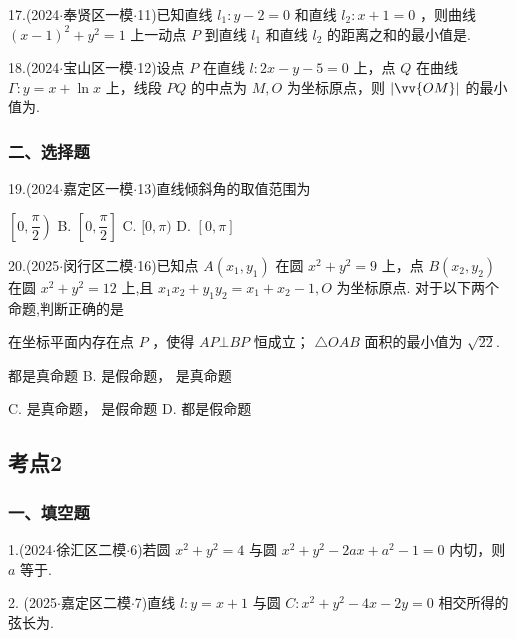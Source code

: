 17.(2024$\cdot$奉贤区一模$\cdot$11)已知直线 ${l}_{1} : y - 2 = 0$ 和直线 ${l}_{2} : x + 1 = 0$ ，则曲线 ${\left( x - 1\right) }^{2} + {y}^{2} = 1$ 上一动点 $P$ 到直线 ${l}_{1}$ 和直线 ${l}_{2}$ 的距离之和的最小值是\blkda[2]{}.

18.(2024$\cdot$宝山区一模$\cdot$12)设点 $P$ 在直线 $l : {2x} - y - 5 = 0$ 上，点 $Q$ 在曲线 $\Gamma  : y = x + \ln x$ 上，线段 ${PQ}$ 的中点为 $M,O$ 为坐标原点，则 $\left| \vv{OM}\right|$ 的最小值为\blkda[2]{}.

\subsubsection*{二、选择题}

19.(2024$\cdot$嘉定区一模$\cdot$13)直线倾斜角的取值范围为 \dotfill{(\kh{})}

\xx{}{}{}{}$\left\lbrack  {0,\dfrac{\pi }{2}}\right)$ B. $\left\lbrack  {0,\dfrac{\pi }{2}}\right\rbrack$ C. $\lbrack 0,\pi )$ D. $\left\lbrack  {0,\pi }\right\rbrack$

20.(2025$\cdot$闵行区二模$\cdot$16)已知点 $A\left( {{x}_{1},{y}_{1}}\right)$ 在圆 ${x}^{2} + {y}^{2} = 9$ 上，点 $B\left( {{x}_{2},{y}_{2}}\right)$ 在圆 ${x}^{2} + {y}^{2} = {12}$ 上,且 ${x}_{1}{x}_{2} + {y}_{1}{y}_{2} = {x}_{1} + {x}_{2} - 1,O$ 为坐标原点. 对于以下两个命题,判断正确的是

   在坐标平面内存在点 $P$ ，使得 ${AP}\bot {BP}$ 恒成立；   $\bigtriangleup  {OAB}$ 面积的最小值为 $\sqrt{22}$.

\xx{}{}{}{}    都是真命题 B.   是假命题，  是真命题

C.   是真命题，  是假命题 D.     都是假命题

\subsection*{考点2}

\subsubsection*{一、填空题}

1.(2024$\cdot$徐汇区二模$\cdot$6)若圆 ${x}^{2} + {y}^{2} = 4$ 与圆 ${x}^{2} + {y}^{2} - {2ax} + {a}^{2} - 1 = 0$ 内切，则 $a$ 等于\blkda[2]{}.

2. (2025$\cdot$嘉定区二模$\cdot$7)直线 $l : y = x + 1$ 与圆 $C : {x}^{2} + {y}^{2} - {4x} - {2y} = 0$ 相交所得的弦长为\blkda[2]{}.

